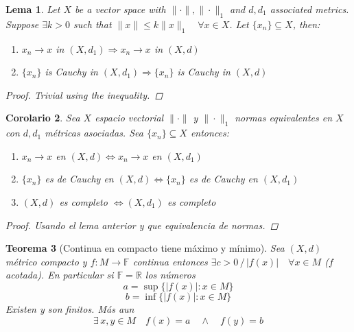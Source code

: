 \documentclass[12pt,a4paper]{article}
\newtheorem{theorem}{Teorema}[section]
\newtheorem{lemma}[theorem]{Lema}
\newtheorem{corollary}[theorem]{Corolario}
\theoremstyle{definition}
\theoremstyle{remark}
\begin{document}
\begin{lemma}
Let $X$ be a vector space with $\|\cdot\|, \|\cdot\|_1$ and $d, d_1$ associated metrics. Suppose $\exists k>0$ such that $\|x\| \leq k \|x\|_1\quad \forall x \in X$. Let $\{x_n\}\subseteq X$, then:
\begin{enumerate}
    \item $x_n \rightarrow x$ in $(X, d_1) \Longrightarrow x_n \rightarrow x$ in $(X, d)$
    \item $\{x_n\}$ is Cauchy in $(X, d_1) \Longrightarrow \{x_n\}$ is Cauchy in $(X, d)$
\end{enumerate}
\begin{proof}
Trivial using the inequality.
\end{proof}
\end{lemma}

\begin{corollary}
Sea $X$ espacio vectorial $\|\cdot\|$ y $\|\cdot\|_1$ normas equivalentes en $X$ con $d,d_1$ métricas asociadas. Sea $\{x_n\}\subseteq X$ entonces:
\begin{enumerate}
    \item $x_n\rightarrow x$ en $(X,d)\iff x_n\rightarrow x$ en $(X,d_1)$
    \item $\{x_n\}$ es de Cauchy en $(X,d)\iff \{x_n\}$ es de Cauchy en $(X,d_1)$
    \item $(X,d)$ es completo $\iff (X,d_1)$ es completo
\end{enumerate}
\begin{proof}
Usando el lema anterior y que equivalencia de normas.
\end{proof}
\end{corollary}

\begin{theorem}[Continua en compacto tiene máximo y mínimo]
Sea $(X,d)$ métrico compacto y $f:M\rightarrow \mathbb{F}$ continua entonces $\exists c>0 \,/\, |f(x)|\quad\forall x \in M$ ($f$ acotada).
En particular si $\mathbb{F}=\mathbb{R}$ los números
$$a = \sup\{|f(x)| :x \in M\}$$
$$b = \inf\{|f(x)| :x \in M\}$$
Existen y son finitos. Más aun 
$$\exists\, x,y \in M \quad f(x)=a \quad \land\quad f(y)=b$$
\end{theorem}
\end{document}
